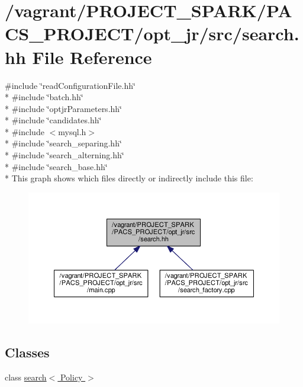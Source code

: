 \hypertarget{search_8hh}{\section{/vagrant/\-P\-R\-O\-J\-E\-C\-T\-\_\-\-S\-P\-A\-R\-K/\-P\-A\-C\-S\-\_\-\-P\-R\-O\-J\-E\-C\-T/opt\-\_\-jr/src/search.hh File Reference}
\label{search_8hh}
}
{\ttfamily \#include \char`\"{}read\-Configuration\-File.\-hh\char`\"{}}\\*
{\ttfamily \#include \char`\"{}batch.\-hh\char`\"{}}\\*
{\ttfamily \#include \char`\"{}optjr\-Parameters.\-hh\char`\"{}}\\*
{\ttfamily \#include \char`\"{}candidates.\-hh\char`\"{}}\\*
{\ttfamily \#include $<$mysql.\-h$>$}\\*
{\ttfamily \#include \char`\"{}search\-\_\-separing.\-hh\char`\"{}}\\*
{\ttfamily \#include \char`\"{}search\-\_\-alterning.\-hh\char`\"{}}\\*
{\ttfamily \#include \char`\"{}search\-\_\-base.\-hh\char`\"{}}\\*
This graph shows which files directly or indirectly include this file\-:\nopagebreak
\begin{figure}[H]
\begin{center}
\leavevmode
\includegraphics[width=350pt]{search_8hh__dep__incl}
\end{center}
\end{figure}
\subsection*{Classes}
\begin{DoxyCompactItemize}
\item 
class \hyperlink{classsearch}{search$<$ Policy $>$}
\end{DoxyCompactItemize}
